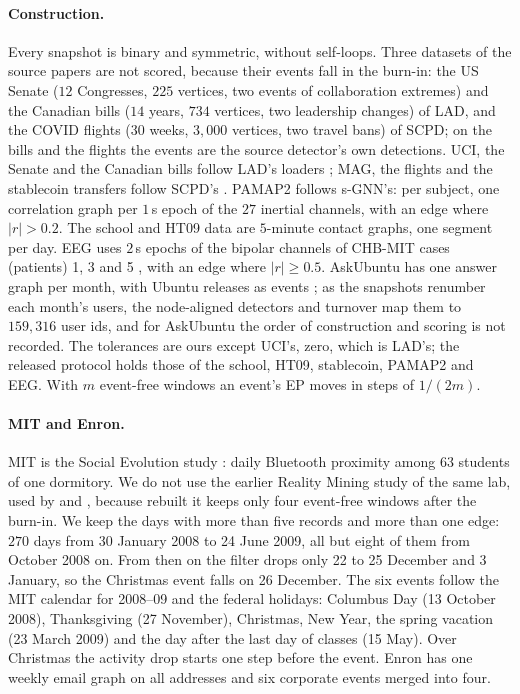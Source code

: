 \documentclass[11pt]{article}
\theoremstyle{dsplain}
\theoremstyle{definition}
\begin{document}
\paragraph{Construction.} Every snapshot is binary and symmetric, without self-loops. Three datasets of
the source papers are not scored, because their events fall in the burn-in: the US Senate ($12$
Congresses, $225$ vertices, two events of collaboration extremes) and the Canadian bills ($14$ years,
$734$ vertices, two leadership changes) of LAD, and the COVID flights ($30$ weeks, $3{,}000$ vertices,
two travel bans) of SCPD; on the bills and the flights the events are the source detector's own
detections. UCI, the Senate and
the Canadian bills follow LAD's loaders \citep{opsahl2009clustering,huang2020laplacian}; MAG, the flights
and the stablecoin transfers follow SCPD's \citep{huang2023fast}. PAMAP2 \citep{reiss2012introducing}
follows s-GNN's: per subject, one correlation graph per $1$\,s epoch of the $27$ inertial channels, with an
edge where $|r| > 0.2$. The school and HT09 data \citep{stehle2011high,isella2011whats} are $5$-minute
contact graphs, one segment per day. EEG uses $2$\,s epochs of the bipolar channels of CHB-MIT cases
(patients) 1, 3 and 5 \citep{shoeb2009application}, with an edge where $|r| \ge 0.5$. AskUbuntu has one
answer graph per month, with Ubuntu releases as events \citep{miller2020size}; as the snapshots renumber
each month's users, the node-aligned detectors and turnover map them to $159{,}316$ user ids, and for
AskUbuntu the order of construction and scoring is not recorded.  The tolerances are ours except UCI's, zero, which is LAD's; the released
protocol holds those of the school, HT09, stablecoin, PAMAP2 and EEG. With $m$ event-free windows an
event's EP moves in steps of $1/(2m)$.

\paragraph{MIT and Enron.} MIT is the Social Evolution study \citep{madan2012sensing}: daily Bluetooth
proximity among $63$ students of one dormitory. We do not use the earlier Reality Mining study of the same
lab, used by \citet{peel2015detecting} and \citet{kendrick2018change}, because rebuilt it keeps only four
event-free windows after the burn-in. We keep the days with more than five records and more than one edge:
$270$ days from 30 January 2008 to 24 June 2009, all but eight of them from October 2008 on. From then on
the filter drops only 22 to 25 December and 3 January, so the Christmas event falls on 26 December. The six
events follow the MIT calendar for 2008--09 \citep{mit2008calendar} and the federal holidays: Columbus Day
(13 October 2008), Thanksgiving (27 November), Christmas, New Year, the spring vacation (23 March 2009) and
the day after the last day of classes (15 May). Over Christmas the activity drop starts one step before
the event. Enron has one weekly email graph on all addresses
\citep{klimt2004enron} and six corporate events merged into four.
\end{document}
